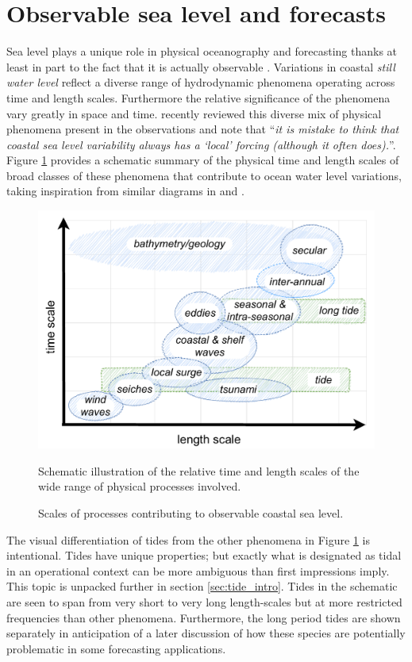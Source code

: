 \section{Observable sea level and forecasts}

Sea level plays a unique role in physical oceanography and forecasting thanks at least in part to the fact that it is actually observable \citep{Wilson:2010hy}. 
Variations in coastal \emph{still water level} \citep{Pugh:2014di} reflect a diverse range of hydrodynamic phenomena operating across time and length scales.   Furthermore the relative significance of the phenomena vary greatly in space and time.
\citet{10.1007/s10712-019-09531-1} recently reviewed this diverse mix of physical phenomena present in the observations and note that ``\textit{it is mistake to think that coastal sea level variability always has a ‘local’ forcing (although it often does).}''. 
Figure \ref{fig:sealevelScales} provides a schematic summary of the physical time and length scales of broad classes of these phenomena that contribute to ocean water level variations, taking inspiration from similar diagrams in \citet{10.1007/s10712-019-09531-1} and \citet{Chelton:2001ws}.
\begin{figure}[!hbt]\centering
  \includegraphics[width=\figwidthFull]{figures/diagrams/scales_time_length.pdf}
  \caption{Scales of processes contributing to observable coastal sea level.}{Schematic illustration of the relative time and length scales of the wide range of physical processes involved.}
  \label{fig:sealevelScales}
\end{figure}
The visual differentiation of tides from the other phenomena in Figure \ref{fig:sealevelScales} is intentional.  Tides have unique properties; but exactly what is designated as tidal in an operational context can be more ambiguous than first impressions imply. This topic is unpacked further in section \ref{sec:tide_intro}. Tides in the schematic are seen to span from very short to very long length-scales but at more restricted frequencies than other phenomena.    Furthermore, the long period tides are shown separately in anticipation of a later discussion of how these species are potentially problematic in some forecasting applications.


